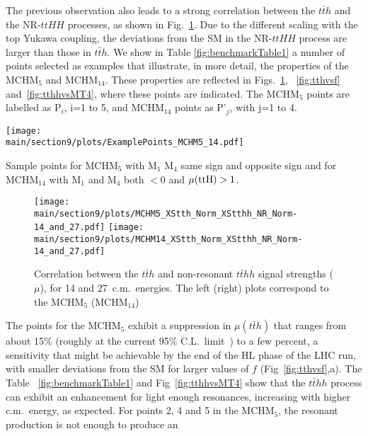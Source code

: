 The previous observation also leads to a strong correlation between the $t\bar{t}h$ and the NR-$ttHH$ processes, as shown in Fig.~\ref{fig:nrtthhvstth}. Due to the different scaling with the top Yukawa coupling, the deviations from the SM in the NR-$ttHH$ process are larger than those in $t\bar{t}h$.
\label{benchmarks}
We show in Table \ref{fig:benchmarkTable1} 
a number of points selected as examples that illustrate, in
more detail, the properties of the MCHM$_5$ and MCHM$_{14}$.  
These properties are reflected in Figs.~\ref{fig:nrtthhvstth}, ~\ref{fig:tthvsf} and~\ref{fig:tthhvsMT4}, where these points are indicated. The MCHM$_5$ points are labelled as P$_i$, i=1 to 5, and MCHM$_{14}$ points as P'$_j$, with j=1 to 4.
%
\begin{table}[t]
\centering
\texttt{[image: \\main/section9/plots/ExamplePoints\_MCHM5\_14.pdf]}
\caption{Sample points for MCHM$_5$ with M$_1$ M$_4$ same sign and opposite sign and for MCHM$_{14}$ with M$_1$ and M$_4$ both $<0$ and $\mu({\rm ttH})>1$.}
\label{fig:benchmarkTable1}
\end{table}
%
\begin{figure}[t]
\centering
\texttt{[image: \\main/section9/plots/MCHM5\_XStth\_Norm\_XStthh\_NR\_Norm-14\_and\_27.pdf]}
\hspace{1.5cm}
\texttt{[image: \\main/section9/plots/MCHM14\_XStth\_Norm\_XStthh\_NR\_Norm-14\_and\_27.pdf]}
\caption{Correlation between the $t\bar{t}h$ and
non-resonant $t\bar{t}hh$ signal strengths ($\mu$), for 14 and 27~\UTeV c.m.~energies. The left (right) plots correspond to the MCHM$_5$ (MCHM$_{14}$)}
\label{fig:nrtthhvstth}
\end{figure}
%
The points for the MCHM$_5$ exhibit a suppression in $\mu(t\bar{t}h)$ that ranges from about 15\% (roughly at the current
95\% C.L.~limit~\cite{Aaboud:2018urx, Sirunyan:2018hoz}) to a few
percent, a sensitivity that might be achievable by the end of the HL
phase of the LHC run, with smaller deviations from the SM for larger values of $f$ (Fig~\ref{fig:tthvsf},a). The Table ~\ref{fig:benchmarkTable1} and Fig~\ref{fig:tthhvsMT4} show that the
$t\bar{t}hh$ process can exhibit an enhancement for light enough
resonances, increasing with higher c.m.~energy, as expected. For points 2, 4 and 5 in the MCHM$_{5}$, the resonant production is not enough to produce an
